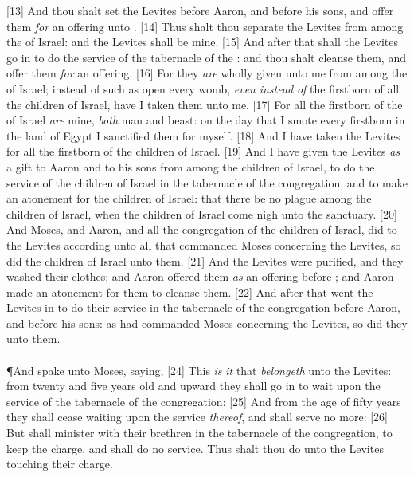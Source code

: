 [13] \textcolor[cmyk]{0.99998,1,0,0}{And thou shalt set the Levites before Aaron, and before his sons, and offer them \emph{for} an offering unto .}
[14] \textcolor[cmyk]{0.99998,1,0,0}{Thus shalt thou separate the Levites from among the  of Israel: and the Levites shall be mine.}
[15] \textcolor[cmyk]{0.99998,1,0,0}{And after that shall the Levites go in to do the service of the tabernacle of the : and thou shalt cleanse them, and offer them \emph{for} an offering.}
[16] \textcolor[cmyk]{0.99998,1,0,0}{For they \emph{are} wholly given unto me from among the  of Israel; instead of such as open every womb, \emph{even} \emph{instead} \emph{of} the firstborn of all the children of Israel, have I taken them unto me.}
[17] \textcolor[cmyk]{0.99998,1,0,0}{For all the firstborn of the  of Israel \emph{are} mine, \emph{both} man and beast: on the day that I smote every firstborn in the land of Egypt I sanctified them for myself.}
[18] \textcolor[cmyk]{0.99998,1,0,0}{And I have taken the Levites for all the firstborn of the children of Israel.}
[19] \textcolor[cmyk]{0.99998,1,0,0}{And I have given the Levites \emph{as} a gift to Aaron and to his sons from among the children of Israel, to do the service of the children of Israel in the tabernacle of the congregation, and to make an atonement for the children of Israel: that there be no plague among the children of Israel, when the children of Israel come nigh unto the sanctuary.}
[20] \textcolor[cmyk]{0.99998,1,0,0}{And Moses, and Aaron, and all the congregation of the children of Israel, did to the Levites according unto all that  commanded Moses concerning the Levites, so did the children of Israel unto them.}
[21] \textcolor[cmyk]{0.99998,1,0,0}{And the Levites were purified, and they washed their clothes; and Aaron offered them \emph{as} an offering before ; and Aaron made an atonement for them to cleanse them.}
[22] \textcolor[cmyk]{0.99998,1,0,0}{And after that went the Levites in to do their service in the tabernacle of the congregation before Aaron, and before his sons: as  had commanded Moses concerning the Levites, so did they unto them.}\\
\\
\P \textcolor[cmyk]{0.99998,1,0,0}{And  spake unto Moses, saying,}
[24] \textcolor[cmyk]{0.99998,1,0,0}{This \emph{is} \emph{it} that \emph{belongeth} unto the Levites: from twenty and five years old and upward they shall go in to wait upon the service of the tabernacle of the congregation:}
[25] \textcolor[cmyk]{0.99998,1,0,0}{And from the age of fifty years they shall cease waiting upon the service \emph{thereof}, and shall serve no more:}
[26] \textcolor[cmyk]{0.99998,1,0,0}{But shall minister with their brethren in the tabernacle of the congregation, to keep the charge, and shall do no service. Thus shalt thou do unto the Levites touching their charge.}